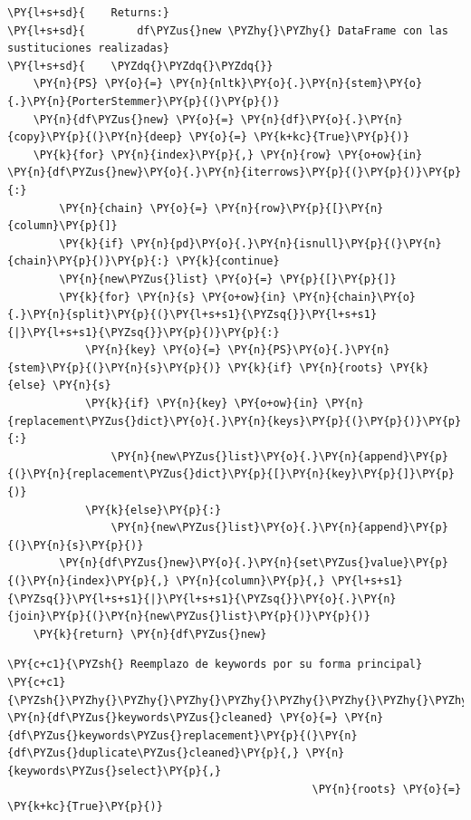 \begin{tcolorbox}[breakable, size=fbox, boxrule=1pt, pad at break*=1mm,colback=cellbackground, colframe=cellborder]
\begin{Verbatim}[commandchars=\\\{\}]
\PY{l+s+sd}{    Returns:}
\PY{l+s+sd}{        df\PYZus{}new \PYZhy{}\PYZhy{} DataFrame con las sustituciones realizadas}
\PY{l+s+sd}{    \PYZdq{}\PYZdq{}\PYZdq{}}
    \PY{n}{PS} \PY{o}{=} \PY{n}{nltk}\PY{o}{.}\PY{n}{stem}\PY{o}{.}\PY{n}{PorterStemmer}\PY{p}{(}\PY{p}{)}
    \PY{n}{df\PYZus{}new} \PY{o}{=} \PY{n}{df}\PY{o}{.}\PY{n}{copy}\PY{p}{(}\PY{n}{deep} \PY{o}{=} \PY{k+kc}{True}\PY{p}{)}
    \PY{k}{for} \PY{n}{index}\PY{p}{,} \PY{n}{row} \PY{o+ow}{in} \PY{n}{df\PYZus{}new}\PY{o}{.}\PY{n}{iterrows}\PY{p}{(}\PY{p}{)}\PY{p}{:}
        \PY{n}{chain} \PY{o}{=} \PY{n}{row}\PY{p}{[}\PY{n}{column}\PY{p}{]}
        \PY{k}{if} \PY{n}{pd}\PY{o}{.}\PY{n}{isnull}\PY{p}{(}\PY{n}{chain}\PY{p}{)}\PY{p}{:} \PY{k}{continue}
        \PY{n}{new\PYZus{}list} \PY{o}{=} \PY{p}{[}\PY{p}{]}
        \PY{k}{for} \PY{n}{s} \PY{o+ow}{in} \PY{n}{chain}\PY{o}{.}\PY{n}{split}\PY{p}{(}\PY{l+s+s1}{\PYZsq{}}\PY{l+s+s1}{|}\PY{l+s+s1}{\PYZsq{}}\PY{p}{)}\PY{p}{:} 
            \PY{n}{key} \PY{o}{=} \PY{n}{PS}\PY{o}{.}\PY{n}{stem}\PY{p}{(}\PY{n}{s}\PY{p}{)} \PY{k}{if} \PY{n}{roots} \PY{k}{else} \PY{n}{s}
            \PY{k}{if} \PY{n}{key} \PY{o+ow}{in} \PY{n}{replacement\PYZus{}dict}\PY{o}{.}\PY{n}{keys}\PY{p}{(}\PY{p}{)}\PY{p}{:}
                \PY{n}{new\PYZus{}list}\PY{o}{.}\PY{n}{append}\PY{p}{(}\PY{n}{replacement\PYZus{}dict}\PY{p}{[}\PY{n}{key}\PY{p}{]}\PY{p}{)}
            \PY{k}{else}\PY{p}{:}
                \PY{n}{new\PYZus{}list}\PY{o}{.}\PY{n}{append}\PY{p}{(}\PY{n}{s}\PY{p}{)}       
        \PY{n}{df\PYZus{}new}\PY{o}{.}\PY{n}{set\PYZus{}value}\PY{p}{(}\PY{n}{index}\PY{p}{,} \PY{n}{column}\PY{p}{,} \PY{l+s+s1}{\PYZsq{}}\PY{l+s+s1}{|}\PY{l+s+s1}{\PYZsq{}}\PY{o}{.}\PY{n}{join}\PY{p}{(}\PY{n}{new\PYZus{}list}\PY{p}{)}\PY{p}{)} 
    \PY{k}{return} \PY{n}{df\PYZus{}new}
\end{Verbatim}
\end{tcolorbox}

    \begin{tcolorbox}[breakable, size=fbox, boxrule=1pt, pad at break*=1mm,colback=cellbackground, colframe=cellborder]
\begin{Verbatim}[commandchars=\\\{\}]
\PY{c+c1}{\PYZsh{} Reemplazo de keywords por su forma principal}
\PY{c+c1}{\PYZsh{}\PYZhy{}\PYZhy{}\PYZhy{}\PYZhy{}\PYZhy{}\PYZhy{}\PYZhy{}\PYZhy{}\PYZhy{}\PYZhy{}\PYZhy{}\PYZhy{}\PYZhy{}\PYZhy{}\PYZhy{}\PYZhy{}\PYZhy{}\PYZhy{}\PYZhy{}\PYZhy{}\PYZhy{}\PYZhy{}\PYZhy{}\PYZhy{}\PYZhy{}\PYZhy{}\PYZhy{}\PYZhy{}\PYZhy{}\PYZhy{}\PYZhy{}\PYZhy{}\PYZhy{}\PYZhy{}\PYZhy{}\PYZhy{}\PYZhy{}\PYZhy{}\PYZhy{}\PYZhy{}\PYZhy{}\PYZhy{}\PYZhy{}\PYZhy{}\PYZhy{}\PYZhy{}\PYZhy{}\PYZhy{}\PYZhy{}}
\PY{n}{df\PYZus{}keywords\PYZus{}cleaned} \PY{o}{=} \PY{n}{df\PYZus{}keywords\PYZus{}replacement}\PY{p}{(}\PY{n}{df\PYZus{}duplicate\PYZus{}cleaned}\PY{p}{,} \PY{n}{keywords\PYZus{}select}\PY{p}{,}
                                               \PY{n}{roots} \PY{o}{=} \PY{k+kc}{True}\PY{p}{)}
\end{Verbatim}
\end{tcolorbox}

